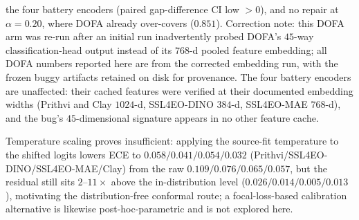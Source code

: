 \documentclass[11pt]{article}
\begin{document}
the four battery encoders (paired gap-difference CI low $>0$), and no repair at $\alpha=0.20$, where DOFA already
over-covers ($0.851$). Correction note: this DOFA arm was re-run after an initial run
inadvertently probed DOFA's $45$-way classification-head output instead of
its $768$-d pooled feature embedding; all DOFA numbers reported here are from the corrected
embedding run, with the frozen buggy artifacts retained on disk for provenance. The four battery encoders are
unaffected: their cached features were verified at their documented embedding widths (Prithvi and Clay
$1024$-d, SSL4EO-DINO $384$-d, SSL4EO-MAE $768$-d), and the bug's $45$-dimensional signature appears in no
other feature cache.

Temperature scaling \citep{guo2017calibration} proves insufficient: applying the source-fit temperature to the shifted logits
lowers ECE to $0.058/0.041/0.054/0.032$ (Prithvi/SSL4EO-DINO/SSL4EO-MAE/Clay) from the raw
$0.109/0.076/0.065/0.057$, but the residual still sits $2$--$11\times$ above the in-distribution level
($0.026/0.014/0.005/0.013$), motivating the distribution-free conformal route; a focal-loss-based
calibration alternative \citep{mukhoti2020calibrating} is likewise post-hoc-parametric and is not explored here.
\end{document}
